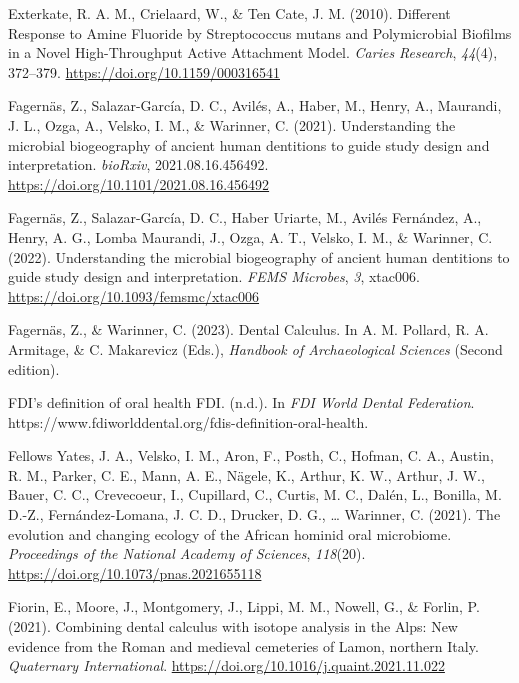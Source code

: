 \documentclass[
  b5paper,
]{book}
\newlength{\cslhangindent}
\newlength{\cslentryspacingunit} %
\newenvironment{CSLReferences}[2] %
 {%
  \setlength{\parindent}{0pt}
  \ifodd #1
  \let\oldpar\par
  \def\par{\hangindent=\cslhangindent\oldpar}
  \fi
  \setlength{\parskip}{#2\cslentryspacingunit}
 }%
 {}
\begin{document}
\begin{CSLReferences}{1}{0}
\leavevmode{}%
Exterkate, R. A. M., Crielaard, W., \& Ten Cate, J. M. (2010). Different
{Response} to {Amine Fluoride} by {Streptococcus} mutans and
{Polymicrobial Biofilms} in a {Novel High-Throughput Active Attachment
Model}. \emph{Caries Research}, \emph{44}(4), 372--379.
\url{https://doi.org/10.1159/000316541}

\leavevmode{}%
Fagernäs, Z., Salazar-García, D. C., Avilés, A., Haber, M., Henry, A.,
Maurandi, J. L., Ozga, A., Velsko, I. M., \& Warinner, C. (2021).
Understanding the microbial biogeography of ancient human dentitions to
guide study design and interpretation. \emph{bioRxiv},
2021.08.16.456492. \url{https://doi.org/10.1101/2021.08.16.456492}

\leavevmode{}%
Fagernäs, Z., Salazar-García, D. C., Haber Uriarte, M., Avilés
Fernández, A., Henry, A. G., Lomba Maurandi, J., Ozga, A. T., Velsko, I.
M., \& Warinner, C. (2022). Understanding the microbial biogeography of
ancient human dentitions to guide study design and interpretation.
\emph{FEMS Microbes}, \emph{3}, xtac006.
\url{https://doi.org/10.1093/femsmc/xtac006}

\leavevmode{}%
Fagernäs, Z., \& Warinner, C. (2023). Dental {Calculus}. In A. M.
Pollard, R. A. Armitage, \& C. Makarevicz (Eds.), \emph{Handbook of
{Archaeological Sciences}} (Second edition).

\leavevmode{}%
{FDI}'s definition of oral health \textbar{} {FDI}. (n.d.). In \emph{FDI
World Dental Federation}.
https://www.fdiworlddental.org/fdis-definition-oral-health.

\leavevmode{}%
Fellows Yates, J. A., Velsko, I. M., Aron, F., Posth, C., Hofman, C. A.,
Austin, R. M., Parker, C. E., Mann, A. E., Nägele, K., Arthur, K. W.,
Arthur, J. W., Bauer, C. C., Crevecoeur, I., Cupillard, C., Curtis, M.
C., Dalén, L., Bonilla, M. D.-Z., Fernández-Lomana, J. C. D., Drucker,
D. G., \ldots{} Warinner, C. (2021). The evolution and changing ecology
of the {African} hominid oral microbiome. \emph{Proceedings of the
National Academy of Sciences}, \emph{118}(20).
\url{https://doi.org/10.1073/pnas.2021655118}

\leavevmode{}%
Fiorin, E., Moore, J., Montgomery, J., Lippi, M. M., Nowell, G., \&
Forlin, P. (2021). Combining dental calculus with isotope analysis in
the {Alps}: {New} evidence from the {Roman} and medieval cemeteries of
{Lamon}, northern {Italy}. \emph{Quaternary International}.
\url{https://doi.org/10.1016/j.quaint.2021.11.022}


\end{CSLReferences}
\end{document}
